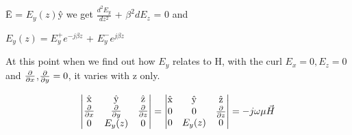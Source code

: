 \={E} = $E_y(z)$\^{y}\hspace{0.15cm} we get\hspace{0.15cm} $\frac{d^2E_y}{dz^2}$ + $\beta^2dE_z$ = 0 and 

$E_y(z) = E_y^+e^{-j\beta z}$ + $E_y^-e^{j\beta z}$

At this point when we find out how $E_y$ relates to H, with the curl $E_x = 0, E_z = 0$ and $\pdv{}{x}$,$\pdv{}{y} = 0$, it varies with z only.

\begin{dmath*}
\begin{vmatrix}
$\^{x}$ & $\^{y}$ & $\^{z}$\\
\frac{\partial}{\partial x} & \frac{\partial}{\partial y} & \frac{\partial}{\partial z}\\
0 & E_y(z) & 0
\end{vmatrix} =
\begin{vmatrix}
$\^{x}$ & $\^{y}$ & $\^{z}$\\
0 & 0 & \frac{\partial}{\partial z}\\
0 & E_y(z) & 0
\end{vmatrix} =-j\omega\mu\vec{H}
\end{dmath*}

